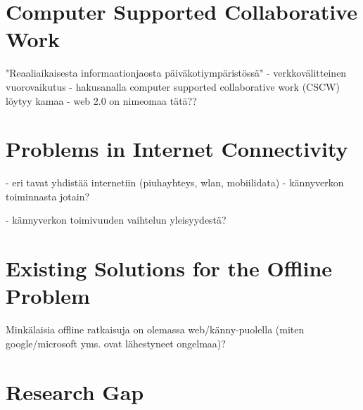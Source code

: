 \section{Computer Supported Collaborative Work}
"Reaaliaikaisesta informaationjaosta päiväkotiympäristössä"
- verkkovälitteinen vuorovaikutus
- hakusanalla computer supported collaborative work (CSCW) löytyy kamaa 
- web 2.0 on nimeomaa tätä??



\section{Problems in Internet Connectivity}
 - eri tavat yhdistää internetiin (piuhayhteys, wlan, mobiilidata)
 - kännyverkon toiminnasta jotain?

 - kännyverkon toimivuuden vaihtelun yleisyydestä? 




\section{Existing Solutions for the Offline Problem}
Minkälaisia offline ratkaisuja on olemassa web/känny-puolella (miten google/microsoft yms. ovat lähestyneet ongelmaa)?



\section{Research Gap}
